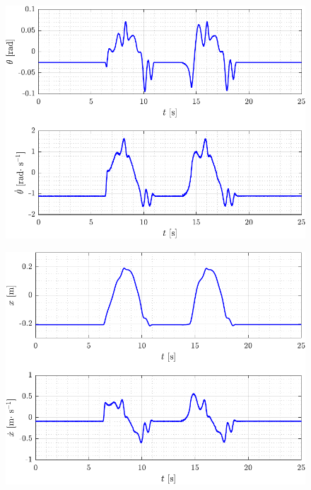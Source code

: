 \begin{figure}[H]\vspace{-2.5cm}
  \includegraphics[width=\textwidth]{figures/slidingModeTest2theta}
\end{figure}\nopagebreak
\begin{figure}[H]\vspace{-.5cm}
  \includegraphics[width=\textwidth]{figures/slidingModeTest2x}
\end{figure}




